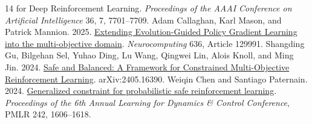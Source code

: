 \documentclass[sigconf,nonacm]{acmart}
\begin{document}
\begin{thebibliography}{14}
{for Deep Reinforcement Learning}. \emph{Proceedings of the AAAI Conference on
Artificial Intelligence} 36, 7, 7701--7709.
 Adam Callaghan, Karl Mason, and Patrick Mannion. 2025.
\href{https://doi.org/10.1016/j.neucom.2025.129991}{Extending Evolution-Guided
Policy Gradient Learning into the multi-objective domain}.
\emph{Neurocomputing} 636, Article 129991.
 Shangding Gu, Bilgehan Sel, Yuhao Ding, Lu Wang, Qingwei Lin,
Alois Knoll, and Ming Jin. 2024.
\href{https://arxiv.org/abs/2405.16390}{Safe and Balanced: A Framework for
Constrained Multi-Objective Reinforcement Learning}. arXiv:2405.16390.
 Weiqin Chen and Santiago Paternain. 2024.
\href{https://proceedings.mlr.press/v242/chen24b.html}{Generalized constraint for
probabilistic safe reinforcement learning}. \emph{Proceedings of the 6th Annual
Learning for Dynamics \& Control Conference}, PMLR 242, 1606--1618.
\end{thebibliography}
\end{document}
